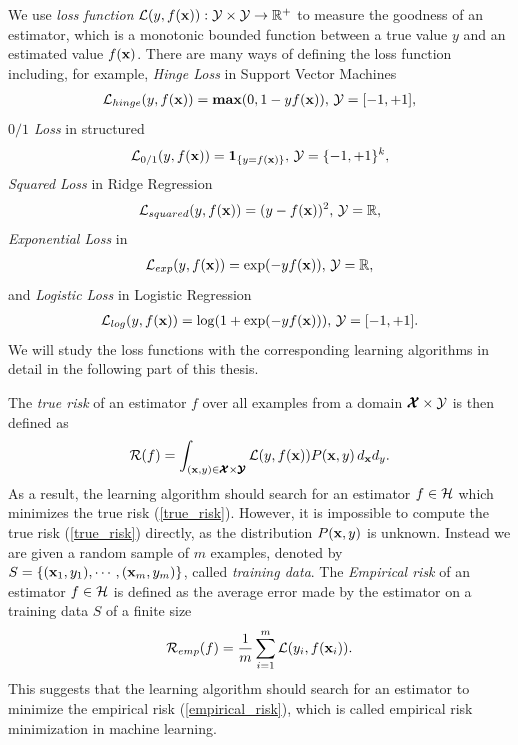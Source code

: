 We use \textit{loss function} $\mathcal{L}(y,f(\mathbf {x})):\mathcal{Y}\times\mathcal{Y}\rightarrow\mathbb{R}^+$ to measure the goodness of an estimator, which is a monotonic bounded function between a true value $y$ and an estimated value $f(\mathbf {x})$.
There are many ways of defining the loss function including, for example,
\textit{Hinge Loss} in Support Vector Machines \citep{Cortes95support}
\begin{align}
	\mathcal{L}_{hinge}(y,f(\mathbf {x})) = \textbf{max} (0,1-y f(\mathbf {x})),\, \mathcal{Y}=[-1,+1], \label{hinge_loss}
\end{align}
\textit{$0/1$ Loss} in structured \svm\ \citep{THJA04}
\begin{align}
	\mathcal{L}_{0/1}(y,f(\mathbf {x})) = \mathbf{1}_{\{y=f(\mathbf {x})\}},\, \mathcal{Y} = \{-1,+1\}^k, \label{one_loss}
\end{align}
\textit{Squared Loss} in Ridge Regression \citep{Hoerl00ridge}
\begin{align*}
	\mathcal{L}_{squared}(y,f(\mathbf {x})) = (y-f(\mathbf {x}))^2,\, \mathcal{Y}=\mathbb{R},
\end{align*}
\textit{Exponential Loss} in \adaboost\ \citep{Schapire99improved}
\begin{align}
	\mathcal{L}_{exp}(y,f(\mathbf {x})) = \exp(-y f(\mathbf {x})),\, \mathcal{Y}=\mathbb{R}, \label{exp_loss}
\end{align}
and \textit{Logistic Loss} in Logistic Regression \citep{Chen99}
\begin{align}
	\mathcal{L}_{log}(y,f(\mathbf {x})) = \log(1+\exp(-y f(\mathbf {x}))),\, \mathcal{Y}=[-1,+1]. \label{log_loss}
\end{align}
We will study the loss functions with the corresponding learning algorithms in detail in the following part of this thesis.

The \textit{true risk} of an estimator $f$ over all examples from a domain $\pmb {\mathcal{X}}\times\mathcal{Y}$ is then defined as
\begin{align}
	\mathcal{R}(f) = \int_{(\mathbf {x},y)\in\pmb {\mathcal{X}}\times\pmb {\mathcal{Y}}}\mathcal{L}(y,f(\mathbf {x}))P(\mathbf {x},y)\,d_{\mathbf {x}}d_{y} \label{true_risk}.
\end{align}
As a result, the learning algorithm should search for an estimator $f\in\mathcal{H}$ which minimizes the true risk (\ref{true_risk}).
However, it is impossible to compute the true risk (\ref{true_risk}) directly, as the distribution $P(\mathbf {x},y)$ is unknown.
Instead we are given a random sample of $m$ examples, denoted by $S=\{(\mathbf {x}_1,y_1),\cdots,(\mathbf {x}_m,y_m)\}$, called \textit{training data}.
The \textit{Empirical risk} of an estimator $f\in\mathcal{H}$ is defined as the average error made by the estimator on a training data $S$ of a finite size
\begin{align}
	\mathcal{R}_{emp}(f) = \frac{1}{m}\sum_{i=1}^{m}\mathcal{L}(y_i,f(\mathbf {x}_i)) \label{empirical_risk}.
\end{align}
This suggests that the learning algorithm should search for an estimator to minimize the empirical risk (\ref{empirical_risk}), which is called {empirical risk minimization} \citep{Vapnik92principles} in machine learning.

